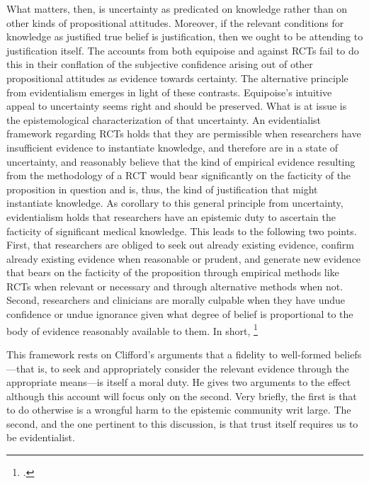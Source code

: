 \documentclass[letterpaper,notitlepage,12pt]{article}
\begin{document}
What matters, then, is uncertainty as predicated on knowledge rather than on
other kinds of propositional attitudes.
Moreover, if the relevant conditions for knowledge as justified true belief is
justification, then we ought to be attending to justification itself.
The accounts from both equipoise and against RCTs fail to do this in their
conflation of the subjective confidence arising out of other propositional
attitudes as evidence towards certainty.
The alternative principle from evidentialism emerges in light of these
contrasts.
Equipoise's intuitive appeal to uncertainty seems right and should be preserved.
What is at issue is the epistemological characterization of that uncertainty.
An evidentialist framework regarding RCTs holds that they are permissible when
researchers have insufficient evidence to instantiate knowledge, and therefore
are in a state of uncertainty, and reasonably believe that the kind of empirical
evidence resulting from the methodology of a RCT would bear significantly on the
facticity of the proposition in question and is, thus, the kind of justification
that might instantiate knowledge.
As corollary to this general principle from uncertainty, evidentialism holds
that researchers have an epistemic duty to ascertain the facticity of
significant medical knowledge.
This leads to the following two points.
First, that researchers are obliged to seek out already existing evidence,
confirm already existing evidence when reasonable or prudent, and generate new
evidence that bears on the facticity of the proposition through empirical
methods like RCTs when relevant or necessary and through alternative methods
when not.
Second, researchers and clinicians are morally culpable when they have undue
confidence or undue ignorance given what degree of belief is proportional to the
body of evidence reasonably available to them.
In short, \footcite[p. 346]{clifford_ethics_1886}

This framework rests on Clifford's arguments that a fidelity to well-formed
beliefs---that is, to seek and appropriately consider the relevant evidence
through the appropriate means---is itself a moral duty.
He gives two arguments to the effect although this account will focus only on
the second.
Very briefly, the first is that to do otherwise is a wrongful harm to
the epistemic community writ large.
The second, and the one pertinent to this discussion, is that trust itself
requires us to be evidentialist.
\end{document}
